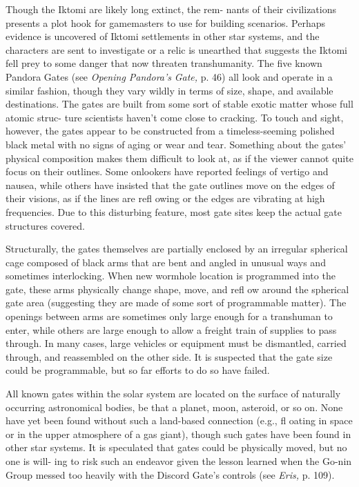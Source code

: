 Though the Iktomi are likely long extinct, the rem-
nants of their civilizations presents a plot hook for 
gamemasters to use for building scenarios. Perhaps 
evidence is uncovered of Iktomi settlements in other 
star systems, and the characters are sent to investigate 
or a relic is unearthed that suggests the Iktomi fell 
prey to some danger that now threaten transhumanity. 
The five known Pandora Gates (see \textit{Opening Pandora's }
\textit{Gate,} p. 46) all look and operate in a similar fashion, 
though they vary wildly in terms of size, shape, and 
available destinations. The gates are built from some 
sort of stable exotic matter whose full atomic struc-
ture scientists haven't come close to cracking. To touch 
and sight, however, the gates appear to be constructed 
from a timeless-seeming polished black metal with no 
signs of aging or wear and tear. Something about the 
gates' physical composition makes them difficult to 
look at, as if the viewer cannot quite focus on their 
outlines. Some onlookers have reported feelings of 
vertigo and nausea, while others have insisted that the 
gate outlines move on the edges of their visions, as if 
the lines are refl owing or the edges are vibrating at 
high frequencies. Due to this disturbing feature, most 
gate sites keep the actual gate structures covered.

Structurally, the gates themselves are partially 
enclosed by an irregular spherical cage composed of 
black arms that are bent and angled in unusual ways 
and sometimes interlocking. When new wormhole 
location is programmed into the gate, these arms 
physically change shape, move, and refl ow  around 
the spherical gate area (suggesting they are made of 
some sort of programmable matter). The openings 
between arms are sometimes only large enough for 
a transhuman to enter, while others are large enough 
to allow a freight train of supplies to pass through. 
In many cases, large vehicles or equipment must be 
dismantled, carried through, and reassembled on the 
other side. It is suspected that the gate size could be 
programmable, but so far efforts to do so have failed.

All known gates within the solar system are located 
on the surface of naturally occurring astronomical 
bodies, be that a planet, moon, asteroid, or so on. 
None have yet been found without such a land-based 
connection (e.g., fl oating in space or in the upper 
atmosphere of a gas giant), though such gates have 
been found in other star systems. It is speculated that 
gates could be physically moved, but no one is will-
ing to risk such an endeavor given the lesson learned 
when the Go-nin Group messed too heavily with the 
Discord Gate's controls (see \textit{Eris, }p. 109).

